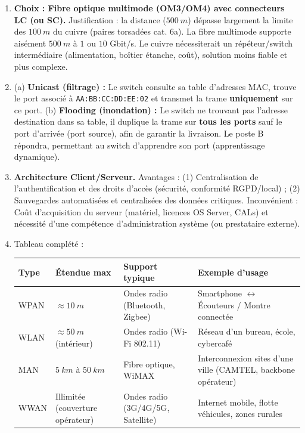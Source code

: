 \documentclass[11pt]{article}
\begin{document}
\begin{corrige}
\begin{enumerate}
  \item \textbf{Choix : Fibre optique multimode (OM3/OM4) avec connecteurs LC (ou SC).} Justification : la distance ($\SI{500}{m}$) dépasse largement la limite des $\SI{100}{m}$ du cuivre (paires torsadées cat. 6a). La fibre multimode supporte aisément $\SI{500}{m}$ à $1$ ou $10$ Gbit/s. Le cuivre nécessiterait un répéteur/switch intermédiaire (alimentation, boîtier étanche, coût), solution moins fiable et plus complexe.
  \item (a) \textbf{Unicast (filtrage) :} Le switch consulte sa table d'adresses MAC, trouve le port associé à \texttt{AA:BB:CC:DD:EE:02} et transmet la trame \textbf{uniquement} sur ce port. (b) \textbf{Flooding (inondation) :} Le switch ne trouvant pas l'adresse destination dans sa table, il duplique la trame sur \textbf{tous les ports} sauf le port d'arrivée (port source), afin de garantir la livraison. Le poste B répondra, permettant au switch d'apprendre son port (apprentissage dynamique).
  \item \textbf{Architecture Client/Serveur.} Avantages : (1) Centralisation de l'authentification et des droits d'accès (sécurité, conformité RGPD/local) ; (2) Sauvegardes automatisées et centralisées des données critiques. Inconvénient : Coût d'acquisition du serveur (matériel, licences OS Server, CALs) et nécessité d'une compétence d'administration système (ou prestataire externe).
  \item Tableau complété :
  \begin{center}
  \begin{tabularx}{\linewidth}{|l|X|X|X|}
  \hline
  \rowcolor{popblueL}
  \textbf{Type} & \textbf{Étendue max} & \textbf{Support typique} & \textbf{Exemple d'usage} \\
  \hline
  WPAN & $\approx \SI{10}{m}$ & Ondes radio (Bluetooth, Zigbee) & Smartphone $\leftrightarrow$ Écouteurs / Montre connectée \\
  \hline
  WLAN & $\approx \SI{50}{m}$ (intérieur) & Ondes radio (Wi-Fi 802.11) & Réseau d'un bureau, école, cybercafé \\
  \hline
  MAN & $\SI{5}{km}$ à $\SI{50}{km}$ & Fibre optique, WiMAX & Interconnexion sites d'une ville (CAMTEL, backbone opérateur) \\
  \hline
  WWAN & Illimitée (couverture opérateur) & Ondes radio (3G/4G/5G, Satellite) & Internet mobile, flotte véhicules, zones rurales \\
  \hline
  \end{tabularx}
  \end{center}
\end{enumerate}
\end{corrige}
\end{document}
